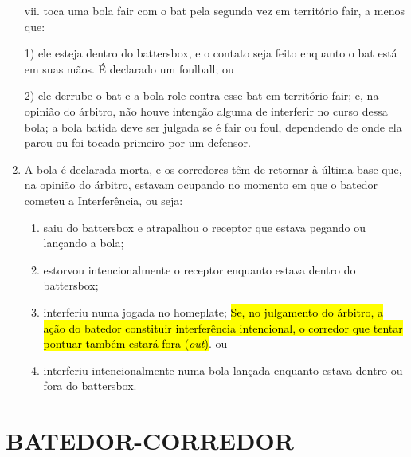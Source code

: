 \begin{enumerate}[label=(\alph*)]
	vii. toca uma bola \gls{fair} com o \gls{bat} pela segunda vez em território \gls{fair}, a menos que:

	1) ele esteja dentro do \gls{battersbox}, e o contato seja feito enquanto o \gls{bat} está em suas mãos. É declarado um \gls{foulball}; ou

	2) ele derrube o \gls{bat} e a bola role contra esse \gls{bat} em território \gls{fair}; e,
	na opinião do árbitro, não houve intenção alguma de interferir no curso dessa bola; a bola batida deve ser julgada se é \gls{fair} ou \gls{foul}, dependendo de onde ela parou ou foi tocada primeiro por um defensor.

	\item  A bola é declarada morta, e os corredores têm de retornar à última base que, na opinião do árbitro, estavam ocupando no momento em que o batedor cometeu a Interferência, ou seja:

	\begin{enumerate}[label=\roman*.]
		\item saiu do \gls{battersbox} e atrapalhou o receptor que estava pegando ou lançando a bola;
		\item estorvou intencionalmente o receptor enquanto estava dentro do \gls{battersbox};
		\item interferiu numa jogada no \gls{homeplate}; \hl{Se, no julgamento do \'arbitro, a a\c{c}\~ao do batedor constituir interfer\^encia intencional, o corredor que tentar pontuar tamb\'em estar\'a fora (\textit{out})}. ou
		\item interferiu intencionalmente numa bola lançada enquanto estava dentro ou fora do \gls{battersbox}.
	\end{enumerate}
\end{enumerate}

\section{BATEDOR-CORREDOR}
